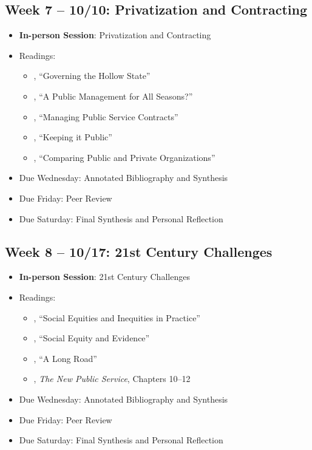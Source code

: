 \documentclass[12pt, letterpaper]{article}
\begin{document}
\subsection*{Week 7 -- 10/10: Privatization and Contracting}
\begin{itemize}
    \item \textbf{In-person Session}: Privatization and Contracting
    \item Readings:
        \begin{itemize}
            \item \citet{milward2000}, ``Governing the Hollow State''
            \item \cite{hood1991}, ``A Public Management for All Seasons?''
            \item \citet{brown2006}, ``Managing Public Service Contracts''
            \item \citet{jos2009}, ``Keeping it Public''
            \item \citet{rainey2000}, ``Comparing Public and Private Organizations''
        \end{itemize}
        \item Due Wednesday: Annotated Bibliography and Synthesis
        \item Due Friday: Peer Review
        \item Due Saturday: Final Synthesis and Personal Reflection
\end{itemize}

\subsection*{Week 8 -- 10/17: 21st Century Challenges}
\begin{itemize}
    \item \textbf{In-person Session}: 21st Century Challenges
    \item Readings:
        \begin{itemize}
            \item \citet{maynard-moody2012}, ``Social Equities and Inequities in Practice'' 
            \item \citet{GOODEN2017}, ``Social Equity and Evidence'' 
            \item \citet{mccandless2022}, ``A Long Road''
            \item \citet{Denhardt2015}, \emph{The New Public Service}, Chapters 10--12 
        \end{itemize}
        \item Due Wednesday: Annotated Bibliography and Synthesis
        \item Due Friday: Peer Review
        \item Due Saturday: Final Synthesis and Personal Reflection
\end{itemize}
\end{document}
